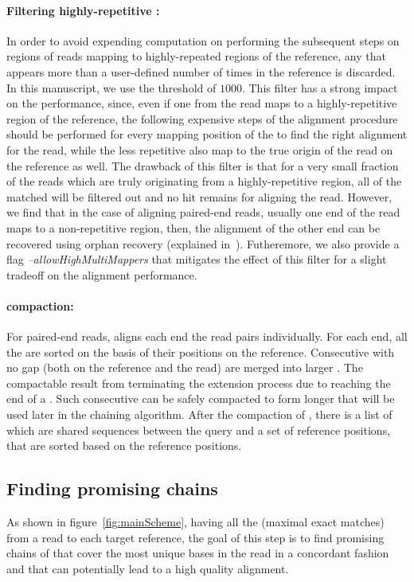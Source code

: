 \paragraph{Filtering highly-repetitive \unimems:}
\label{par:repetitivehits}
In order to avoid expending computation on performing the subsequent
steps on regions of reads mapping to highly-repeated regions of the
reference, any \unimem that appears more than a user-defined number
of times in the reference is discarded. In this manuscript, we use
the threshold of $1000$. This filter has a strong impact on the
performance, since, even if one \kmer from the read maps to a
highly-repetitive region of the reference, the following expensive
steps of the alignment procedure should be performed for every
mapping position of the \unimem to find the right alignment for the
read, while the less repetitive \unimems also map to the true origin
of the read on the reference as well. The drawback of this filter is that
for a very small fraction of the reads which are truly originating
from a highly-repetitive region, all of the matched \unimems will be
filtered out and no hit remains for aligning the read. However,
we find that in the case of aligning paired-end reads, usually one
end of the read maps to a non-repetitive region, then, the alignment
of the other end can be recovered using orphan recovery (explained
in~). Futheremore, we also provide 
a flag \textit{--allowHighMultiMappers} that mitigates the effect of this
filter for a slight tradeoff on the alignment performance.

\paragraph{\unimem compaction:}
For paired-end reads, \puffaligner aligns each end the read pairs
individually. For each end, all the \unimems are sorted on the basis
of their positions on the reference. Consecutive \unimems with no gap
(both on the reference and the read) are merged into larger \mems.
The compactable \unimems result from terminating the extension
process due to reaching the end of a \unitig. Such consecutive
\unimems can be safely compacted to form longer \mems that will be
used later in the \mem chaining algorithm. After the compaction of
\unimems, there is a list of \mems which are shared sequences between
the query and a set of reference positions, that are sorted based on
the reference positions.

\subsection{Finding promising \mem chains}
As shown in figure~\ref{fig:mainScheme}, having all the \mems
(maximal exact matches) from a read to each target reference, the
goal of this step is to find promising chains of \mems that cover the
most unique bases in the read in a concordant fashion and that can potentially lead to a high
quality alignment.

